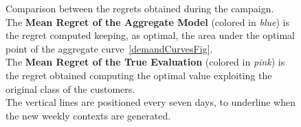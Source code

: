 \begin{figure}[!htb]
	\caption{Comparison between the regrets obtained during the campaign.\\
			The \textbf{Mean Regret of the Aggregate Model} (colored in \textit{blue}) is the regret computed keeping, as optimal, the area under the optimal point of the aggregate curve~\ref{demandCurvesFig}.\\
			The \textbf{Mean Regret of the True Evaluation} (colored in \textit{pink}) is the regret obtained computing the optimal value exploiting the original class of the customers.\\
			The vertical lines are positioned every seven days, to underline when the new weekly contexts are generated.}
	\label{regret5Fig}
\end{figure}
